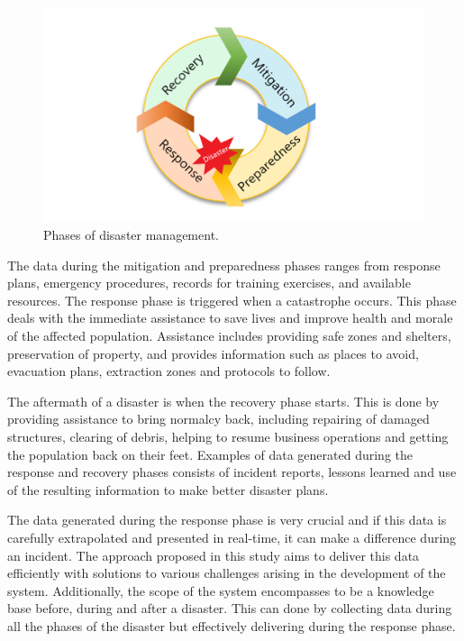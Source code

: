 \begin{figure}[ht!]
	\centering
	\includegraphics[width=150mm]{disaster.png}
	\caption{Phases of disaster management. \label{overflow}}
\end{figure}

The data during the mitigation and preparedness phases ranges from response plans, emergency procedures, records for training exercises, and available resources. The response phase is triggered when a catastrophe occurs. This phase deals with the immediate assistance to save lives and improve health and morale of the affected population. Assistance includes providing safe zones and shelters, preservation of property, and provides information such as places to avoid, evacuation plans, extraction zones and protocols to follow.

The aftermath of a disaster is when the recovery phase starts. This is done by providing assistance to bring normalcy back, including repairing of damaged structures, clearing of debris, helping to resume business operations and getting the population back on their feet. Examples of data generated during the response and recovery phases consists of incident reports, lessons learned and use of the resulting information to make better disaster plans.

The data generated during the response phase is very crucial and if this data is carefully extrapolated and presented in real-time, it can make a difference during an incident. The approach proposed in this study aims to deliver this data efficiently with solutions to various challenges arising in the development of the system. Additionally, the scope of the system encompasses to be a knowledge base before, during and after a disaster. This can done by collecting data during all the phases of the disaster but effectively delivering during the response phase.

